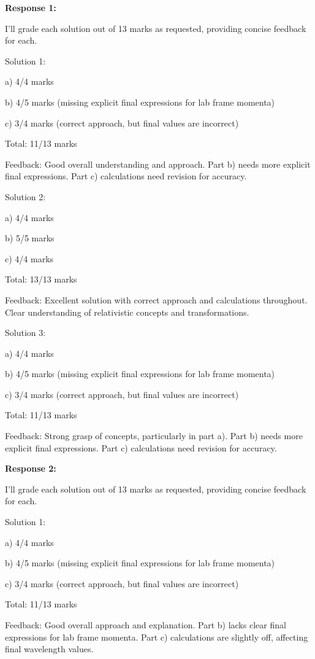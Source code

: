 \documentclass[a4paper,11pt]{article}
\begin{document}
\textbf{Response 1:}

I'll grade each solution out of 13 marks as requested, providing concise feedback for each.

Solution 1:

a) 4/4 marks

b) 4/5 marks (missing explicit final expressions for lab frame momenta)

c) 3/4 marks (correct approach, but final values are incorrect)

Total: 11/13 marks

Feedback: Good overall understanding and approach. Part b) needs more explicit final expressions. Part c) calculations need revision for accuracy.

Solution 2:

a) 4/4 marks

b) 5/5 marks

c) 4/4 marks

Total: 13/13 marks

Feedback: Excellent solution with correct approach and calculations throughout. Clear understanding of relativistic concepts and transformations.

Solution 3:

a) 4/4 marks

b) 4/5 marks (missing explicit final expressions for lab frame momenta)

c) 3/4 marks (correct approach, but final values are incorrect)

Total: 11/13 marks

Feedback: Strong grasp of concepts, particularly in part a). Part b) needs more explicit final expressions. Part c) calculations need revision for accuracy.

\bigskip
\textbf{Response 2:}

I'll grade each solution out of 13 marks as requested, providing concise feedback for each.

Solution 1:

a) 4/4 marks

b) 4/5 marks (missing explicit final expressions for lab frame momenta)

c) 3/4 marks (correct approach, but final values are incorrect)

Total: 11/13 marks

Feedback: Good overall approach and explanation. Part b) lacks clear final expressions for lab frame momenta. Part c) calculations are slightly off, affecting final wavelength values.
\end{document}
